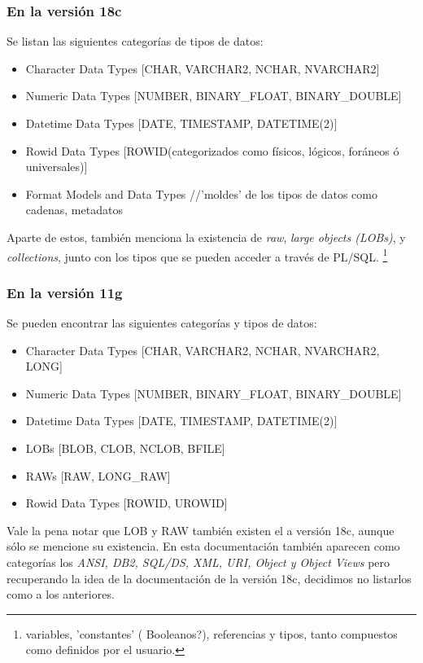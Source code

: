 \documentclass[10pt]{article}
\begin{document}
	\subsubsection*{En la versión 18c}
	Se listan las siguientes categorías de tipos de datos:
	\begin{itemize}
	\small
	    \item Character Data Types [CHAR, VARCHAR2, NCHAR, NVARCHAR2]
        \item Numeric Data Types [NUMBER, BINARY\_FLOAT, BINARY\_DOUBLE]
        \item Datetime Data Types [DATE, TIMESTAMP, DATETIME(2)]
        \item Rowid Data Types [ROWID(categorizados como físicos, lógicos, foráneos ó 
              universales)]
        \item Format Models and Data Types //'moldes' de los tipos de datos como cadenas,
              metadatos
    \end{itemize}
	
	Aparte de estos, también menciona la existencia de \textit{raw}, \textit{large objects
	(LOBs)}, y \textit{collections}, junto con los tipos que se pueden acceder a través de 
	PL/SQL. \footnote{variables, 'constantes' ( Booleanos?), referencias y tipos, tanto 
	compuestos como definidos por el usuario.}
	
	\subsubsection*{En la versión 11g}
	Se pueden encontrar las siguientes categorías y tipos de datos:
	\begin{itemize}
	\small
	    \item Character Data Types [CHAR, VARCHAR2, NCHAR, NVARCHAR2, LONG]
        \item Numeric Data Types [NUMBER, BINARY\_FLOAT, BINARY\_DOUBLE]
        \item Datetime Data Types [DATE, TIMESTAMP, DATETIME(2)]
        \item LOBs [BLOB, CLOB, NCLOB, BFILE]
        \item RAWs [RAW, LONG\_RAW]
        \item Rowid Data Types [ROWID, UROWID]
    \end{itemize}
	
	Vale la pena notar que LOB y RAW también existen el a versión 18c, aunque sólo se
	mencione su existencia. En esta documentación también aparecen como categorías los 
	\textit{ANSI, DB2, SQL/DS, XML, URI, Object y Object Views} pero recuperando la idea 
	de la documentación de la versión 18c, decidimos no listarlos como a los anteriores.
	
\end{document}
